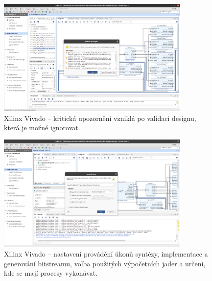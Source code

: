 \documentclass[a4paper, twoside, 11pt]{article}
\begin{document}
\begin{appendices}
		\begin{figure}[htbp!]
			\centering
			\includegraphics[width=0.85\textwidth]{src/png/zybo-xilinx-vivado-flow/zybo-xilinx-vivado-flow-24.jpg}
			\caption{Xilinx Vivado – kritická upozornění vzniklá po validaci designu, která je možné ignorovat.}
			\label{fig:zybo-xilinx-vivado-flow-24}
		\end{figure}


		\begin{figure}[htbp!]
			\centering
			\includegraphics[width=0.85\textwidth]{src/png/zybo-xilinx-vivado-flow/zybo-xilinx-vivado-flow-29.jpg}
			\caption{Xilinx Vivado – nastavení provádění úkonů syntézy, implementace a generování bitstreamu, volba použitých výpočetních jader a určení, kde se mají procesy vykonávat.}
			\label{fig:zybo-xilinx-vivado-flow-29}
		\end{figure}


\end{appendices}
\end{document}
